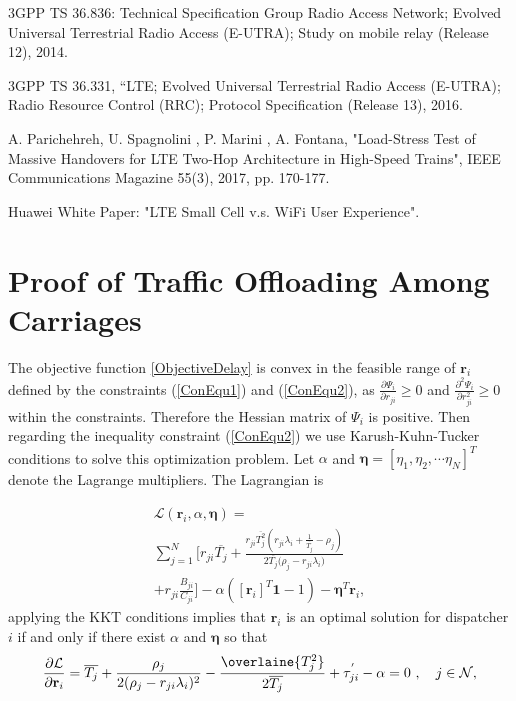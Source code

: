 \documentclass[journal]{IEEEtran}
\begin{document}
{\begin{thebibliography}{1}
3GPP TS 36.836: Technical Specification Group Radio Access Network; Evolved Universal Terrestrial Radio Access (E-UTRA); Study on mobile relay (Release 12), 2014.

3GPP TS 36.331, “LTE; Evolved Universal Terrestrial Radio Access (E-UTRA); Radio Resource Control (RRC); Protocol Specification (Release 13), 2016.

A. Parichehreh, U. Spagnolini , P. Marini , A. Fontana, "Load-Stress Test of Massive Handovers for LTE Two-Hop Architecture in High-Speed Trains", IEEE Communications Magazine 55(3), 2017, pp. 170-177.


Huawei White Paper: "LTE Small Cell v.s. WiFi User Experience".
\end{thebibliography}

\appendices
\section{Proof of Traffic Offloading Among Carriages}

The objective function \ref{ObjectiveDelay} is convex in the feasible range of $\textbf{r}_{i}$ defined by the constraints (\ref{ConEqu1}) and (\ref{ConEqu2}), as $\frac{\partial \Psi_{i}}{\partial r_{ji}}\geq 0$ and $\frac{\partial^{2} \Psi_{i}}{\partial r_{ji}^{2}}\geq 0$ within the constraints. Therefore the Hessian matrix of $\Psi_{i}$ is positive. Then regarding the inequality constraint (\ref{ConEqu2}) we use Karush-Kuhn-Tucker conditions to solve this optimization problem. Let $\alpha$ and $\boldsymbol{\eta}=[\eta_{1},\eta_{2},\cdots\eta_{N}]^{T}$ denote the Lagrange multipliers. The Lagrangian is

\begin{multline}
	\mathcal{L}(\textbf{r}_{i},\alpha, \boldsymbol{\eta}) = \\ \sum_{j=1}^{N} \bigg[ r_{ji}\overline{T_j} + \frac{r_{ji}\overline{T_j^2} (r_{ji}\lambda_{i} + \frac{1}{\overline{T_j}} -\rho_{j})}{2\overline{T_j}\big(\rho_{j}-r_{ji}\lambda_i)} \\+ r_{ji}\frac{B_{ji}}{C_{ji}}\bigg]-\alpha ([{\textbf{r}_{i}}]^{T} \textbf{1}-1 ) - \boldsymbol{\eta}^{T}\mathbf{r}_{i},
\end{multline}
\noindent
applying the KKT conditions implies that $\textbf{r}_{i}$ is an optimal solution for dispatcher $i$ if and only if there exist $\alpha$ and $\boldsymbol{\eta}$ so that
\begin{equation}
	\frac{\partial \mathcal{L}}{\partial \textbf{r}_{i}}= \overline{T_j} + \frac{\rho_{j}}{2(\rho_{j}-r_{ji}\lambda_i)^2}  - \frac{\overlaine{T_{j}^{2}}}{2\overline{T_j}} + \tau_{ji}^{'} -\alpha=0   ~,~~~ j \in \mathcal{N},
	\label{rond}
\end{equation}

}
\end{document}
